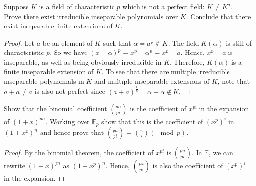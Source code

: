 \documentclass[10pt]{article}
\newenvironment{problem}[2][Problem]{\begin{trivlist}
		\item[\hskip \labelsep {\bfseries #1}\hskip \labelsep {\bfseries #2.}]}{\end{trivlist}}
\begin{document}
	\begin{problem}{5.7}
		Suppose $K$ is a field of characteristic $p$ which is not a perfect field: $K\not=K^p$. Prove there exist irreducible inseparable polynomials over $K$. Conclude that there exist inseparable finite extensions of $K$.
		\begin{proof}
			Let $a$ be an element of $K$ such that $\alpha = a^{\frac{1}{p}} \not \in K$. The field $K(\alpha)$ is still of characteristic $p$. So we have $(x-\alpha)^p = x^p - \alpha^p = x^p-a$. Hence, $x^p-a$ is inseparable, as well as being obviously irreducible in $K$. Therefore, $K(\alpha)$ is a finite inseparable extension of $K$.
			To see that there are multiple irreducible inseparable polynomials in $K$ and multiple inseparable extensions of $K$, note that $a+a \not = a$ is also not perfect since $(a + a)^{\frac{1}{p}} = \alpha + \alpha \not \in K$.
		\end{proof}
	\end{problem}
	
	\begin{problem}{5.9}
		Show that the binomial coefficient $\binom{pn}{pi}$ is the coefficient of $x^{pi}$ in the expansion of $(1+x)^{pn}$. Working over $\mathbb{F}_p$ show that this is the coefficient of $(x^p)^i$ in $(1 + x^p)^n$ and hence prove that $\binom{pn}{pi} = \binom{n}{i} (\mod p)$.
		\begin{proof}
			By the binomial theorem, the coefficient of $x^{pi}$ is $\binom{pn}{pi}$. In $\mathbb{F}$, we can rewrite $(1+x)^{pn}$ as $(1 + x^p)^n$. Hence, $\binom{pn}{pi}$ is also the coefficient of $(x^p)^i$ in the expansion. 
		\end{proof}
	\end{problem}
\end{document}
